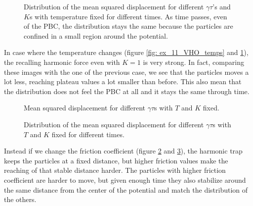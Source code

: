 \documentclass[../main.tex]{subfiles}
\begin{document}
\begin{figure}[!ht]
    \centering
    \begin{subfigure}{.99\textwidth}
        \centering
        
    \end{subfigure}
    \caption{Distribution of the mean squared displacement for different $\gamma\tau$'s and $K$s with temperature fixed for different times. As time passes, even of the PBC, the distribution stays the same because the particles are confined in a small region around the potential.}
    \label{fig: ex_11_VHO_temps_distrib}
\end{figure}
In case where the temperature changes (figure \ref{fig: ex_11_VHO_temps} and \ref{fig: ex_11_VHO_temps_distrib}), the recalling harmonic force even with $K=1$ is very strong. In fact, comparing these images with the one of the previous case, we see that the particles moves a lot less, reaching plateau values a lot smaller than before. This also mean that the distribution does not feel the PBC at all and it stays  the same through time.

\begin{figure}[!p]
    \centering
    \begin{subfigure}{.99\textwidth}
        \centering
        
    \end{subfigure}
    \caption{Mean squared displacement for different $\gamma\tau$s with $T$ and $K$ fixed.}
    \label{fig: ex_11_VHO_gammas}
\end{figure}
\begin{figure}[!p]
    \centering
    \begin{subfigure}{.95\textwidth}
        \centering
        
    \end{subfigure}
    \caption{Distribution of the mean squared displacement for different $\gamma\tau$s with $T$ and $K$ fixed for different times.}
    \label{fig: ex_11_VHO_gammas_distrib}
\end{figure}

Instead if we change the friction coefficient (figure \ref{fig: ex_11_VHO_gammas} and \ref{fig: ex_11_VHO_gammas_distrib}), the harmonic trap keeps the particles at a fixed distance, but higher friction values make the reaching of that stable distance harder. The particles with higher friction coefficient are harder to move, but given enough time they also stabilize around the same distance from the center of the potential and match the distribution of the others.
\end{document}
